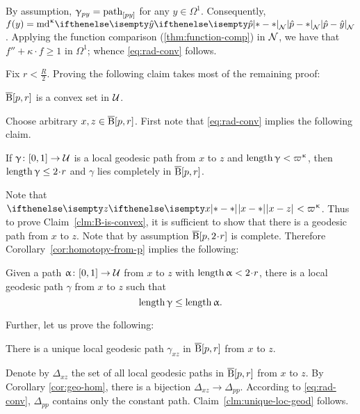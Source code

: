 By assumption,
$\upgamma_{p y}=\mathrm{path}_{[p y]}$ for any $y\in\Omega^1$. 
Consequently,
 $f(y)\z=\md\kappa\dist[{{}}]{\hat{p}}{\hat{y}}{\spc{N}}$.
Applying the function comparison (\ref{thm:function-comp}) in $\mathcal{N}$,
we have that $f''+\kappa\cdot f\ge 1$ in $\Omega^1$;
whence \ref{eq:rad-conv} follows.

Fix $r<\tfrac R2$. Proving the following claim takes most of the remaining proof:

\begin{clm}{}\label{clm:B-is-convex}
$\overline{\mathrm{B}}{}[ p,r]$ is a convex set in $\mathcal{U}$.
\end{clm}

Choose arbitrary $x,z\in \cBall[ p,r]$.
First note that \ref{eq:rad-conv} implies the following claim.

\begin{clm}{}\label{clm:B-is-almost-convex}
If $ \gamma\:[0,1]\to\spc{U}$ 
is a local geodesic path from $x$ to $z$ and  
$\length \gamma\z<\varpi\kappa$,  
then $\length \gamma \le 2\cdot r$ 
and $ \gamma$ lies completely in $\overline{\mathrm{B}}{}[ p,r]$.
\end{clm}

Note that  $\dist{x}{z}{}<\varpi\kappa$.
Thus to prove Claim~\ref{clm:B-is-convex}, it is sufficient to show that there is a geodesic path from $x$ to $z$.
Note that by assumption $\cBall[p,2\cdot r]$ is complete.
Therefore Corollary~\ref{cor:homotopy-from-p} implies the following:

\begin{clm}{}\label{clm:loc-geod<path}
Given a path $\alpha\:[0,1]\to\spc{U}$ from $x$ to $z$ with $\length\alpha<2\cdot r$,
there is a local geodesic path $\gamma$ from $x$ to $z$ such that
\[\length\gamma\le\length\alpha.\]

\end{clm}

Further, let us prove the following:

\begin{clm}{}\label{clm:unique-loc-geod}
There is a unique local geodesic path $\gamma_{x z}$ in $\overline{\mathrm{B}}{}[ p,r]$ from $x$ to $z$.
\end{clm}

Denote by $\Delta_{x z}$ the set of all local geodesic paths in $\overline{\mathrm{B}}{}[ p,r]$ from $x$ to $z$.
By Corollary \ref{cor:geo-hom}, there is a  bijection $\Delta_{x z}\to\Delta_{p p}$.
According to \ref{eq:rad-conv}, 
$\Delta_{p p}$ contains only the constant path.
Claim~\ref{clm:unique-loc-geod} follows.


